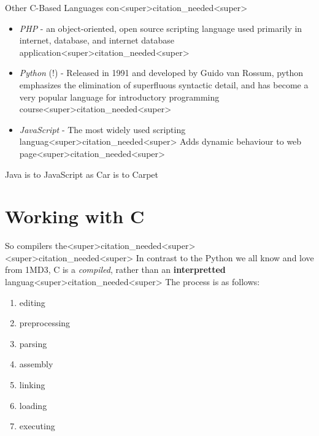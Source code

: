 \documentclass[11pt]{beamer}
\begin{document}
\begin{frame}{Other C-Based Languages con<super>citation_needed<super>}
\begin{itemize}
\item \textit{PHP} - an object-oriented, open source scripting language used primarily in internet, database, and internet database application<super>citation_needed<super>
\item \textit{Python} (!) - Released in 1991 and developed by Guido van Rossum, python emphasizes the elimination of superfluous syntactic detail, and has become a very popular language for introductory programming course<super>citation_needed<super>
\item \textit{JavaScript} - The most widely used scripting languag<super>citation_needed<super>  Adds dynamic behaviour to web page<super>citation_needed<super>  
\end{itemize}
\end{frame}

\begin{frame}{Java is to JavaScript as Car is to Carpet}
\center
\
\end{frame}

\section[Working with C]{Working with C}
\begin{frame}{So compilers the<super>citation_needed<super><super>citation_needed<super>}
In contrast to the Python we all know and love from 1MD3, C is a \textit{compiled}, rather than an \textbf{interpretted} languag<super>citation_needed<super>  The process is as follows: 
\begin{enumerate}
\item editing
\item preprocessing
\item parsing
\item assembly
\item linking
\item loading 
\item executing
\end{enumerate}
\end{frame}
\end{document}
